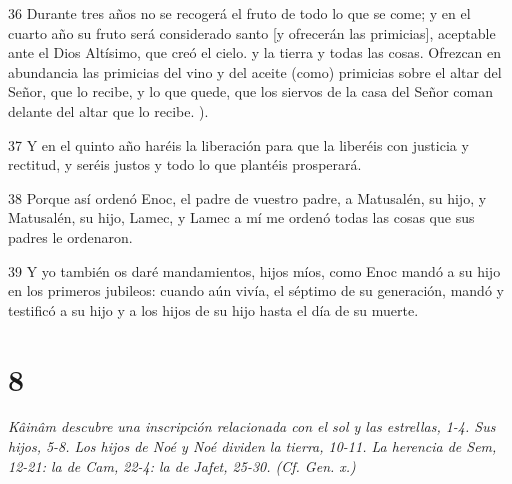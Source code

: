 \par 36 Durante tres años no se recogerá el fruto de todo lo que se come; y en el cuarto año su fruto será considerado santo [y ofrecerán las primicias], aceptable ante el Dios Altísimo, que creó el cielo. y la tierra y todas las cosas. Ofrezcan en abundancia las primicias del vino y del aceite (como) primicias sobre el altar del Señor, que lo recibe, y lo que quede, que los siervos de la casa del Señor coman delante del altar que lo recibe. ).
\par 37 Y en el quinto año haréis la liberación para que la liberéis con justicia y rectitud, y seréis justos y todo lo que plantéis prosperará.
\par 38 Porque así ordenó Enoc, el padre de vuestro padre, a Matusalén, su hijo, y Matusalén, su hijo, Lamec, y Lamec a mí me ordenó todas las cosas que sus padres le ordenaron.
\par 39 Y yo también os daré mandamientos, hijos míos, como Enoc mandó a su hijo en los primeros jubileos: cuando aún vivía, el séptimo de su generación, mandó y testificó a su hijo y a los hijos de su hijo hasta el día de su muerte.

\chapter{8}

\par \textit{Kâinâm descubre una inscripción relacionada con el sol y las estrellas, 1-4. Sus hijos, 5-8. Los hijos de Noé y Noé dividen la tierra, 10-11. La herencia de Sem, 12-21: la de Cam, 22-4: la de Jafet, 25-30. (Cf. Gen. x.)}


